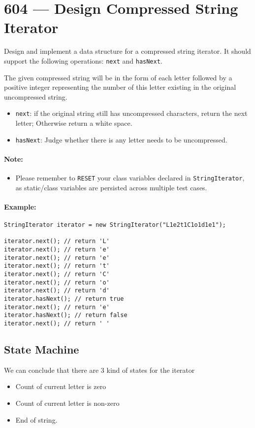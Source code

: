 \section{604 --- Design Compressed String Iterator}
Design and implement a data structure for a compressed string iterator. It should support the following operations: \texttt{next} and \texttt{hasNext}.

The given compressed string will be in the form of each letter followed by a positive integer representing the number of this letter existing in the original uncompressed string.

\begin{itemize}
\item \texttt{next}: if the original string still has uncompressed characters, return the next letter; Otherwise return a white space.
\item \texttt{hasNext}: Judge whether there is any letter needs to be uncompressed.

\end{itemize}
\paragraph{Note:}

\begin{itemize}
\item Please remember to \texttt{RESET} your class variables declared in \texttt{StringIterator}, as static/class variables are persisted across multiple test cases.
\end{itemize}

\paragraph{Example:}
\setcounter{lstlisting}{0}

\begin{lstlisting}[style=customc]
StringIterator iterator = new StringIterator("L1e2t1C1o1d1e1");

iterator.next(); // return 'L'
iterator.next(); // return 'e'
iterator.next(); // return 'e'
iterator.next(); // return 't'
iterator.next(); // return 'C'
iterator.next(); // return 'o'
iterator.next(); // return 'd'
iterator.hasNext(); // return true
iterator.next(); // return 'e'
iterator.hasNext(); // return false
iterator.next(); // return ' '
\end{lstlisting}

\subsection{State Machine}
We can conclude that there are 3 kind of states for the iterator
\begin{itemize}
\item Count of current letter is zero
\item Count of current letter is non-zero
\item End of string.
\end{itemize}

